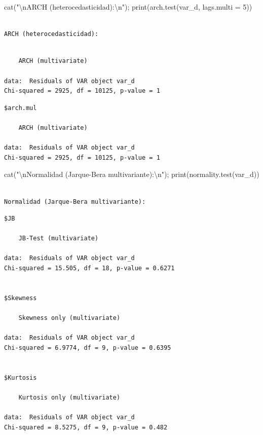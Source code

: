 \documentclass[
  spanish,
  letterpaper,
  DIV=11,
  numbers=noendperiod]{scrartcl}
\newenvironment{Shaded}{\begin{snugshade}}{\end{snugshade}}
\newcommand{\AttributeTok}[1]{\textcolor[rgb]{0.40,0.45,0.13}{#1}}
\newcommand{\DecValTok}[1]{\textcolor[rgb]{0.68,0.00,0.00}{#1}}
\newcommand{\FunctionTok}[1]{\textcolor[rgb]{0.28,0.35,0.67}{#1}}
\newcommand{\NormalTok}[1]{\textcolor[rgb]{0.00,0.23,0.31}{#1}}
\newcommand{\SpecialCharTok}[1]{\textcolor[rgb]{0.37,0.37,0.37}{#1}}
\newcommand{\StringTok}[1]{\textcolor[rgb]{0.13,0.47,0.30}{#1}}
\begin{document}
\begin{Shaded}
\begin{Highlighting}[]
\FunctionTok{cat}\NormalTok{(}\StringTok{"}\SpecialCharTok{\textbackslash{}n}\StringTok{ARCH (heterocedasticidad):}\SpecialCharTok{\textbackslash{}n}\StringTok{"}\NormalTok{);     }\FunctionTok{print}\NormalTok{(}\FunctionTok{arch.test}\NormalTok{(var\_d, }\AttributeTok{lags.multi =} \DecValTok{5}\NormalTok{))}
\end{Highlighting}
\end{Shaded}

\begin{verbatim}

ARCH (heterocedasticidad):
\end{verbatim}

\begin{verbatim}

    ARCH (multivariate)

data:  Residuals of VAR object var_d
Chi-squared = 2925, df = 10125, p-value = 1
\end{verbatim}

\begin{verbatim}
$arch.mul

    ARCH (multivariate)

data:  Residuals of VAR object var_d
Chi-squared = 2925, df = 10125, p-value = 1
\end{verbatim}

\begin{Shaded}
\begin{Highlighting}[]
\FunctionTok{cat}\NormalTok{(}\StringTok{"}\SpecialCharTok{\textbackslash{}n}\StringTok{Normalidad (Jarque{-}Bera multivariante):}\SpecialCharTok{\textbackslash{}n}\StringTok{"}\NormalTok{); }\FunctionTok{print}\NormalTok{(}\FunctionTok{normality.test}\NormalTok{(var\_d))}
\end{Highlighting}
\end{Shaded}

\begin{verbatim}

Normalidad (Jarque-Bera multivariante):
\end{verbatim}

\begin{verbatim}
$JB

    JB-Test (multivariate)

data:  Residuals of VAR object var_d
Chi-squared = 15.505, df = 18, p-value = 0.6271


$Skewness

    Skewness only (multivariate)

data:  Residuals of VAR object var_d
Chi-squared = 6.9774, df = 9, p-value = 0.6395


$Kurtosis

    Kurtosis only (multivariate)

data:  Residuals of VAR object var_d
Chi-squared = 8.5275, df = 9, p-value = 0.482
\end{verbatim}
\end{document}
